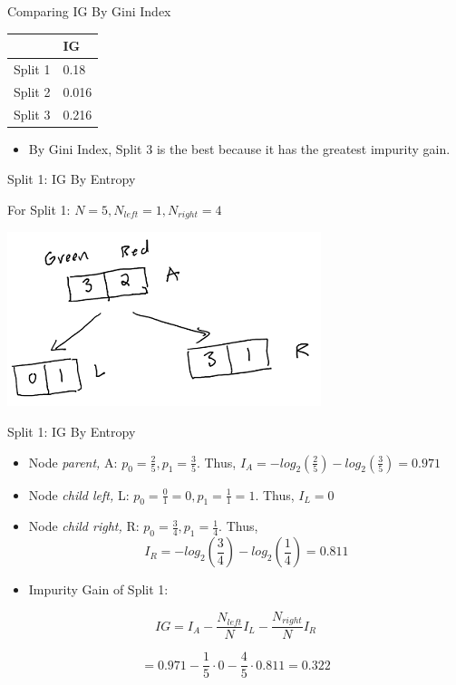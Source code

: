 \documentclass[
  ignorenonframetext,
]{beamer}
\providecommand{\tightlist}{%
  \setlength{\itemsep}{0pt}\setlength{\parskip}{0pt}}
\begin{document}
\begin{frame}{Comparing IG By Gini Index}
\protect\hypertarget{comparing-ig-by-gini-index}{}

\begin{longtable}[]{@{}ll@{}}
\toprule
& IG\tabularnewline
\midrule
\endhead
Split 1 & 0.18\tabularnewline
Split 2 & 0.016\tabularnewline
Split 3 & 0.216\tabularnewline
\bottomrule
\end{longtable}

\begin{itemize}
\tightlist
\item
  By Gini Index, Split 3 is the best because it has the greatest
  impurity gain.
\end{itemize}

\end{frame}

\begin{frame}{Split 1: IG By Entropy}
\protect\hypertarget{split-1-ig-by-entropy}{}

For Split 1: \(N = 5, N_{left} =1, N_{right} = 4\)

\includegraphics{images2/im1.png}

\end{frame}

\begin{frame}{Split 1: IG By Entropy}
\protect\hypertarget{split-1-ig-by-entropy-1}{}

\begin{itemize}
\item
  Node \emph{parent,} A: \(p_0 = \frac{2}{5}, p_1 = \frac{3}{5}\). Thus,
  \(I_{A} = - log_2(\frac{2}{5})-log_2(\frac{3}{5}) = 0.971\)
\item
  Node \emph{child left,} L:
  \(p_0 = \frac{0}{1} = 0, p_1 = \frac{1}{1} = 1\). Thus, \(I_{L} = 0\)
\item
  Node \emph{child right,} R: \(p_0 = \frac{3}{4}, p_1 = \frac{1}{4}\).
  Thus, \[I_{R} = -log_2(\frac{3}{4})-log_2(\frac{1}{4}) = 0.811\]
\item
  Impurity Gain of Split 1:
\end{itemize}

\[
IG = I_{A} - \frac{N_{left}}{N}I_{L}-\frac{N_{right}}{N}I_{R}
\]

\[ = 0.971 - \frac{1}{5} \cdot 0-\frac{4}{5} \cdot 0.811 = 0.322\]

\end{frame}
\end{document}
